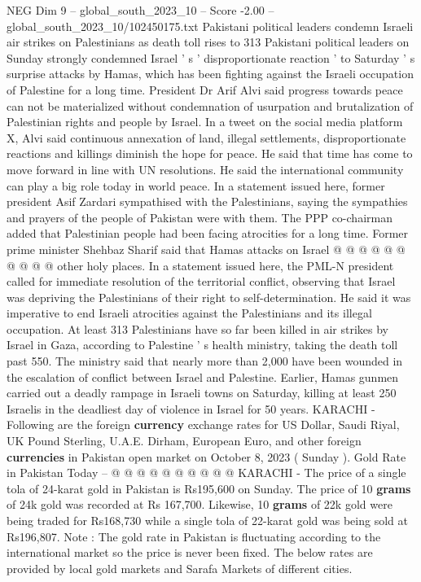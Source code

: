 \begin{textsample}{NEG Dim 9 – global\_south\_2023\_10 – Score -2.00 – global\_south\_2023\_10/102450175.txt}  \label{ex:f9_neg_421}
Pakistani political leaders condemn Israeli air strikes on Palestinians as death toll rises to 313 Pakistani political leaders on Sunday strongly condemned Israel ' s ' disproportionate reaction ' to Saturday ' s surprise attacks by Hamas, which has been fighting against the Israeli occupation of Palestine for a long time.
President Dr Arif Alvi said progress towards peace can not be materialized without condemnation of usurpation and brutalization of Palestinian rights and people by Israel.
In a tweet on the social media platform X, Alvi said continuous annexation of land, illegal settlements, disproportionate reactions and killings diminish the hope for peace.
He said that time has come to move forward in line with UN resolutions.
He said the international community can play a big role today in world peace.
In a statement issued here, former president Asif Zardari sympathised with the Palestinians, saying the sympathies and prayers of the people of Pakistan were with them.
The PPP co-chairman added that Palestinian people had been facing atrocities for a long time.
Former prime minister Shehbaz Sharif said that Hamas attacks on Israel @ @ @ @ @ @ @ @ @ @ other holy places.
In a statement issued here, the PML-N president called for immediate resolution of the territorial conflict, observing that Israel was depriving the Palestinians of their right to self-determination.
He said it was imperative to end Israeli atrocities against the Palestinians and its illegal occupation.
At least 313 Palestinians have so far been killed in air strikes by Israel in Gaza, according to Palestine ' s health ministry, taking the death toll past 550.
The ministry said that nearly more than 2,000 have been wounded in the escalation of conflict between Israel and Palestine.
Earlier, Hamas gunmen carried out a deadly rampage in Israeli towns on Saturday, killing at least 250 Israelis in the deadliest day of violence in Israel for 50 years.
KARACHI - Following are the foreign \textbf{currency} exchange rates for US Dollar, Saudi Riyal, UK Pound Sterling, U.A.E.
Dirham, European Euro, and other foreign \textbf{currencies} in Pakistan open market on October 8, 2023 ( Sunday ).
Gold Rate in Pakistan Today -- @ @ @ @ @ @ @ @ @ @ KARACHI - The price of a single tola of 24-karat gold in Pakistan is Rs195,600 on Sunday.
The price of 10 \textbf{grams} of 24k gold was recorded at Rs 167,700.
Likewise, 10 \textbf{grams} of 22k gold were being traded for Rs168,730 while a single tola of 22-karat gold was being sold at Rs196,807.
Note : The gold rate in Pakistan is fluctuating according to the international market so the price is never been fixed.
The below rates are provided by local gold markets and Sarafa Markets of different cities.

\end{textsample}
